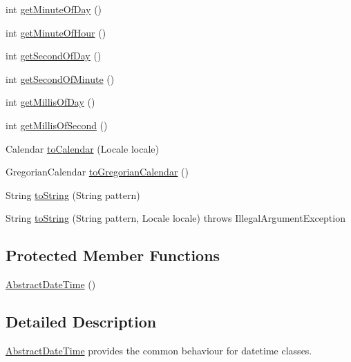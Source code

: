 \begin{DoxyCompactItemize}
\item 
int \hyperlink{classorg_1_1joda_1_1time_1_1base_1_1_abstract_date_time_a3c75b4539d63ab811ee2fbb3c5f801e8}{get\-Minute\-Of\-Day} ()
\item 
int \hyperlink{classorg_1_1joda_1_1time_1_1base_1_1_abstract_date_time_aa150bbf72244aa2081d7b51bb0878ee6}{get\-Minute\-Of\-Hour} ()
\item 
int \hyperlink{classorg_1_1joda_1_1time_1_1base_1_1_abstract_date_time_ab68443a62609800d9c7ae57b9509fdc7}{get\-Second\-Of\-Day} ()
\item 
int \hyperlink{classorg_1_1joda_1_1time_1_1base_1_1_abstract_date_time_aecdafe6acb9ce4c1863a905964445750}{get\-Second\-Of\-Minute} ()
\item 
int \hyperlink{classorg_1_1joda_1_1time_1_1base_1_1_abstract_date_time_a2de11a25442e06b7ffa83dd8d74e7f45}{get\-Millis\-Of\-Day} ()
\item 
int \hyperlink{classorg_1_1joda_1_1time_1_1base_1_1_abstract_date_time_a1b1dee5d25b8a2f918770ac9a2bb2a6c}{get\-Millis\-Of\-Second} ()
\item 
Calendar \hyperlink{classorg_1_1joda_1_1time_1_1base_1_1_abstract_date_time_a422b1ef41dfdd9f99a0012405181b08b}{to\-Calendar} (Locale locale)
\item 
Gregorian\-Calendar \hyperlink{classorg_1_1joda_1_1time_1_1base_1_1_abstract_date_time_adf99fa2078f751d7ccaef24cf288b4ed}{to\-Gregorian\-Calendar} ()
\item 
String \hyperlink{classorg_1_1joda_1_1time_1_1base_1_1_abstract_date_time_ae75163d105ea70dc5cbbd6290d0e3dc2}{to\-String} (String pattern)
\item 
String \hyperlink{classorg_1_1joda_1_1time_1_1base_1_1_abstract_date_time_a0522112a26c322126a10931828c67528}{to\-String} (String pattern, Locale locale)  throws Illegal\-Argument\-Exception 
\end{DoxyCompactItemize}
\subsection*{Protected Member Functions}
\begin{DoxyCompactItemize}
\item 
\hyperlink{classorg_1_1joda_1_1time_1_1base_1_1_abstract_date_time_ad10f64399d9f306b3edb1358f2689c3a}{Abstract\-Date\-Time} ()
\end{DoxyCompactItemize}


\subsection{Detailed Description}
\hyperlink{classorg_1_1joda_1_1time_1_1base_1_1_abstract_date_time}{Abstract\-Date\-Time} provides the common behaviour for datetime classes. 

